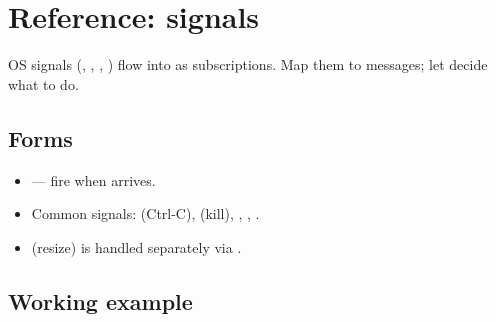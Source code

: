 \chapter{Reference: signals}
\label{ch:refman-signals}

\begin{aside}
OS signals (, , ,
) flow into \maya{} as subscriptions. Map them
to messages; let  decide what to do.
\end{aside}

\section{Forms}

\begin{itemize}[leftmargin=*]
  \item {} — fire
     when  arrives.
  \item Common signals:  (Ctrl-C),
     (kill), ,
    , .
  \item {} (resize) is handled separately via
    .
\end{itemize}

\section{Working example}

